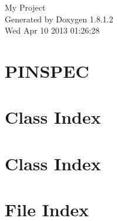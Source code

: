 \documentclass{book}
\begin{document}
\hypersetup{pageanchor=false,citecolor=blue}
\begin{titlepage}
\vspace*{7cm}
\begin{center}
{\Large My Project }\\
\vspace*{1cm}
{\large Generated by Doxygen 1.8.1.2}\\
\vspace*{0.5cm}
{\small Wed Apr 10 2013 01:26:28}\\
\end{center}
\end{titlepage}
\clearemptydoublepage
{}
\tableofcontents
\clearemptydoublepage
{}
\hypersetup{pageanchor=true,citecolor=blue}
\chapter{P\-I\-N\-S\-P\-E\-C}
\label{md_README}
\hypertarget{md_README}{}

\chapter{Class Index}

\chapter{Class Index}

\chapter{File Index}

\end{document}
